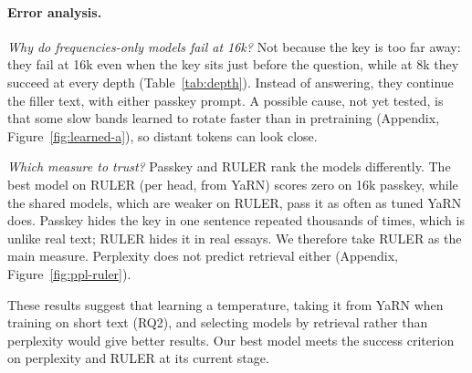 \paragraph{Error analysis.}
\emph{Why do frequencies-only models fail at 16k?} Not because the key is too
far away: they fail at 16k even when the key sits just before the question,
while at 8k they succeed at every depth (Table~\ref{tab:depth}). Instead of
answering, they continue the filler text, with either passkey prompt.
A possible cause, not yet tested, is that some slow bands learned to rotate
faster than in pretraining (Appendix, Figure~\ref{fig:learned-a}), so distant
tokens can look close.

\emph{Which measure to trust?} Passkey and RULER rank the models
differently. The best model on RULER (per head, from YaRN) scores zero on 16k
passkey, while the shared models, which are weaker on RULER, pass it as often
as tuned YaRN does. Passkey hides the key in one sentence repeated thousands of
times, which is unlike real text; RULER hides it in real essays. We therefore
take RULER as the main measure. Perplexity does not predict retrieval either
(Appendix, Figure~\ref{fig:ppl-ruler}).

These results suggest that learning a temperature, taking it from YaRN when
training on short text (RQ2), and selecting models by retrieval rather than
perplexity would give better results. Our best model meets the success
criterion on perplexity and RULER at its current stage.
